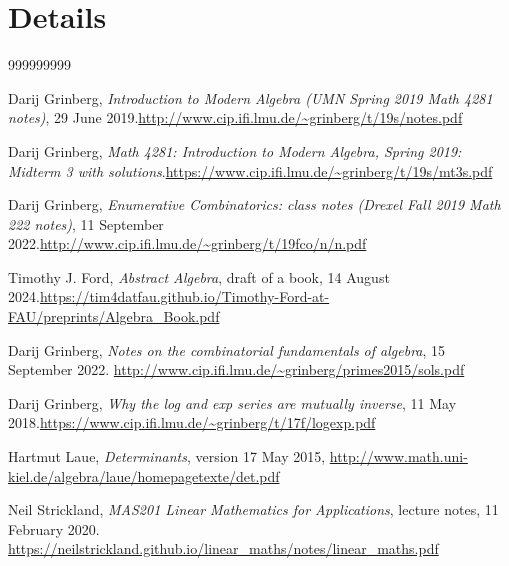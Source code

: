 \appendix
\chapter{Details}






\begin{thebibliography}{999999999}

Darij Grinberg, \textit{Introduction to Modern Algebra (UMN
Spring 2019 Math 4281 notes)}, 29 June 2019.\newline\url{http://www.cip.ifi.lmu.de/~grinberg/t/19s/notes.pdf}

Darij Grinberg, \textit{Math 4281: Introduction to
Modern Algebra, Spring 2019: Midterm 3 with solutions}.\newline\url{https://www.cip.ifi.lmu.de/~grinberg/t/19s/mt3s.pdf}

Darij Grinberg, \textit{Enumerative Combinatorics: class
notes (Drexel Fall 2019 Math 222 notes)}, 11 September 2022.\newline\url{http://www.cip.ifi.lmu.de/~grinberg/t/19fco/n/n.pdf}

Timothy J. Ford, \textit{Abstract Algebra}, draft of a
book, 14 August 2024.\newline\url{https://tim4datfau.github.io/Timothy-Ford-at-FAU/preprints/Algebra_Book.pdf}

Darij Grinberg, \textit{Notes on the combinatorial
fundamentals of algebra}, 15 September 2022.\newline
\url{http://www.cip.ifi.lmu.de/~grinberg/primes2015/sols.pdf}

Darij Grinberg, \textit{Why the log and exp series
are mutually inverse}, 11 May 2018.\newline\url{https://www.cip.ifi.lmu.de/~grinberg/t/17f/logexp.pdf}

Hartmut Laue, \textit{Determinants}, version 17 May
2015,\newline
\url{http://www.math.uni-kiel.de/algebra/laue/homepagetexte/det.pdf}

Neil Strickland, \textit{MAS201 Linear Mathematics
for Applications}, lecture notes, 11 February 2020.\newline
\url{https://neilstrickland.github.io/linear_maths/notes/linear_maths.pdf}


\end{thebibliography}
